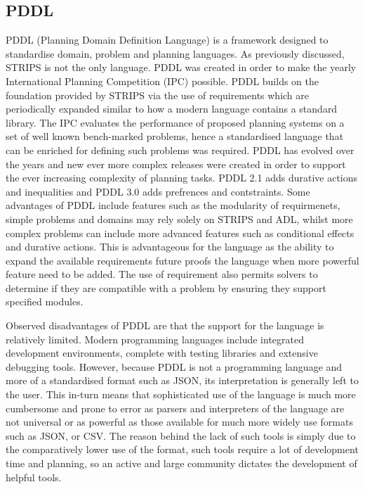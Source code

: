 \subsection{PDDL}
PDDL  (Planning Domain Definition Language) is a framework designed to standardise domain, problem and planning languages. As previously discussed, STRIPS is not the only language. PDDL was created in order to make the yearly International Planning Competition (IPC) possible. PDDL builds on the foundation provided by STRIPS via the use of requirements which are periodically expanded similar to how a modern language contains a standard library. The IPC evaluates the performance of proposed planning systems on a set of well known bench-marked problems, hence a standardised language that can be enriched for defining such problems was required. PDDL has evolved over the years and new ever more complex releases were created in order to support the ever increasing complexity of planning tasks. PDDL 2.1 adds durative actions and inequalities and PDDL 3.0 adds prefrences and contstraints.
Some advantages of PDDL include features such as the modularity of requirmenets, simple problems and domains may rely solely on STRIPS and ADL, whilst more complex problems can include more advanced features such as conditional effects and durative actions.
This is advantageous for the language as the ability to expand the available requirements future proofs the language when more
powerful feature need to be added.
The use of requirement also permits solvers to determine if they are compatible with a problem by ensuring they support specified modules.

Observed disadvantages of PDDL are that the support for the language is relatively limited.
Modern programming languages include integrated development environments, complete with testing libraries and extensive debugging tools.
However, because PDDL is not a programming language and more of a standardised format such as JSON, its interpretation is generally left to the user.
This in-turn means that sophisticated use of the language is much more cumbersome and prone to error as parsers and interpreters of the language are not universal or as powerful as those available for much more widely use formats such as JSON, or CSV.
The reason behind the lack of such tools is simply due to the comparatively lower use of the format, such tools require a lot of development time and planning, so an active and large community dictates the development of helpful tools.


